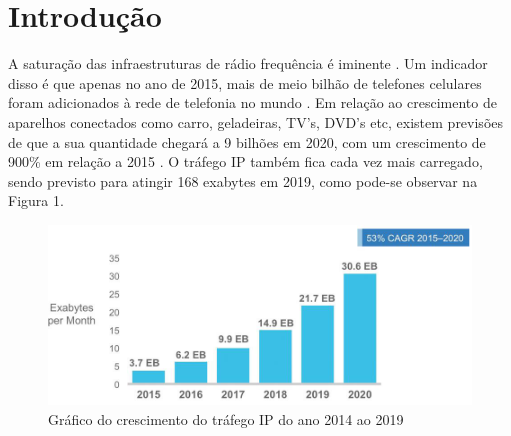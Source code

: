 \documentclass[
12pt,				%
openright,			%
twoside,			%
a4paper,			%
hyphens,
english,			%
french,				%
spanish,			%
brazil				%
]{abntex2}
\begin{document}
		\tableofcontents*
		\cleardoublepage
		
		
		
		\textual
		
		\chapter*[Introdução]{Introdução}
		A saturação das infraestruturas de rádio frequência é iminente \cite{load-balancing}. Um indicador disso é que apenas no ano de 2015, mais de meio bilhão de telefones celulares foram adicionados à rede de telefonia no mundo \cite{xx}. Em relação ao crescimento de aparelhos conectados como carro, geladeiras, TV’s, DVD’s etc, existem previsões de que a sua quantidade chegará a 9 bilhões em 2020, com um crescimento 	de 900\% em relação a 2015 \cite{ibge1993}. O tráfego IP também fica cada vez mais carregado, sendo previsto para atingir 168 exabytes em 2019, como pode-se observar na Figura 1.
		
		\begin{figure}[!htb]
			\caption{\label{fig_cisco}Gráfico do crescimento do tráfego IP do ano 2014 ao 2019}
			\begin{center}
				\includegraphics[scale=0.5]{cisco_exabytes_per_month.png}
			\end{center}
		\end{figure}
		
\end{document}
